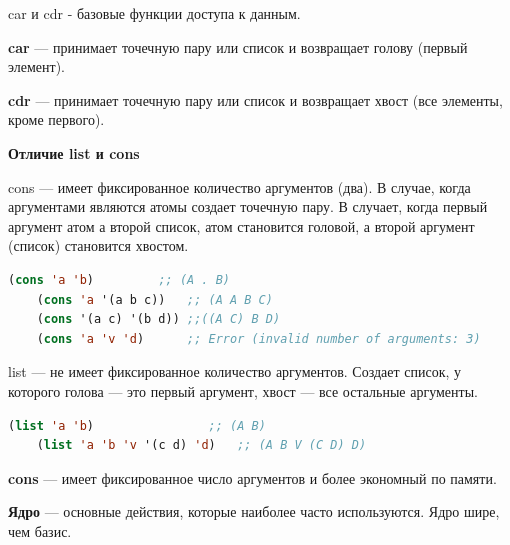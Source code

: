car и cdr - базовые функции доступа к данным. 

\textbf{car} --- принимает точечную пару или список и возвращает голову (первый элемент).

\textbf{cdr} --- принимает точечную пару или список и возвращает хвост (все элементы, кроме первого).

\textbf{Отличие list и cons}

cons --- имеет фиксированное количество аргументов (два). 
В случае, когда аргументами являются атомы создает точечную пару.
В случает, когда первый аргумент атом а второй список, атом становится головой,
а второй аргумент (список) становится хвостом. 
\begin{lstlisting}[language=Lisp]
	(cons 'a 'b) 		 ;; (A . B)
	(cons 'a '(a b c)) 	 ;; (A A B C)
	(cons '(a c) '(b d)) ;;((A C) B D)
	(cons 'a 'v 'd)  	 ;; Error (invalid number of arguments: 3)
\end{lstlisting}

\begin{figure}[ht!]
\end{figure}

list --- не имеет фиксированное количество аргументов. 
Создает список, у которого голова --- это первый аргумент,
хвост --- все остальные аргументы.
\begin{lstlisting}[language=Lisp]
	(list 'a 'b) 				;; (A B)
	(list 'a 'b 'v '(c d) 'd) 	;; (A B V (C D) D)
\end{lstlisting}

\begin{figure}[ht!]
\end{figure}

\textbf{cons} --- имеет фиксированное число аргументов и более экономный по памяти.

\textbf{Ядро} --- основные действия, которые наиболее часто используются. Ядро шире, чем базис.
